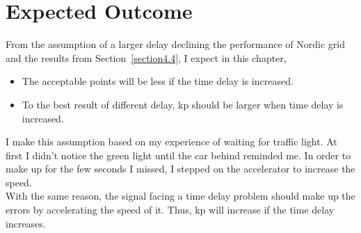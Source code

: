 \section{Expected Outcome} %
\label{section5.2}
From the assumption of a larger delay declining the performance of Nordic grid and the results from Section~\ref{section4.4}, I expect in this chapter, 

\begin{itemize}
    \item The acceptable points will be less if the time delay is increased.  
    \item To the best result of different delay, kp should be larger when time delay is increased.  
\end{itemize}


I make this assumption based on my experience of waiting for traffic light. At first I didn't notice the green light until the car behind reminded me. In order to make up for the few seconds I missed, I stepped on the accelerator to increase the speed.  \\

With the same reason, the signal facing a time delay problem should make up the errors by accelerating the speed of it. Thus, kp will increase if the time delay increases.